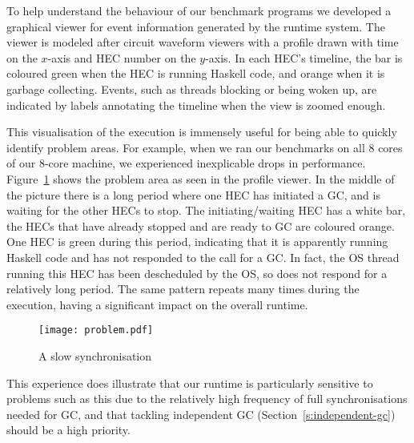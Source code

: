 \documentclass[twocolumn,9pt]{sigplanconf}
\begin{document}
To help understand the behaviour of our benchmark programs we
developed a graphical viewer for event information generated by the
runtime system. The viewer is modeled after circuit waveform viewers
with a profile drawn with time on the $x$-axis and HEC number on the
$y$-axis.  In each HEC's timeline, the bar is coloured green when the
HEC is running Haskell code, and orange when it is garbage collecting.
Events, such as threads blocking or being woken up, are indicated by
labels annotating the timeline when the view is zoomed enough.

This visualisation of the execution is immensely useful for being able
to quickly identify problem areas.  For example, when we ran our
benchmarks on all 8 cores of our 8-core machine, we experienced
inexplicable drops in performance.  Figure~\ref{f:problem} shows the
problem area as seen in the profile viewer.  In the middle of the
picture there is a long period where one HEC has initiated a GC, and
is waiting for the other HECs to stop.  The initiating/waiting HEC has
a white bar, the HECs that have already stopped and are ready to GC
are coloured orange.  One HEC is green during this period, indicating
that it is apparently running Haskell code and has not responded to
the call for a GC.  In fact, the OS thread running this HEC has been
descheduled by the OS, so does not respond for a relatively long
period.  The same pattern repeats many times during the execution,
having a significant impact on the overall runtime.

\begin{figure}
\begin{center}
\texttt{[image: problem.pdf]}
\end{center}
\caption{A slow synchronisation}
\label{f:problem}
\end{figure}

This experience does illustrate that our runtime is particularly
sensitive to problems such as this due to the relatively high
frequency of full synchronisations needed for GC, and that tackling
independent GC (Section~\ref{s:independent-gc}) should be a high
priority.
\end{document}
